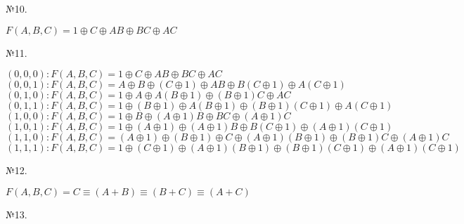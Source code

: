 \documentclass[a4paper,10pt]{report} %
\begin{document}
\newpage
\begin{center}
№10.
\end{center}
\begin{flushleft}
$ F(A,B,C)  = 1 \oplus C \oplus AB \oplus BC \oplus AC$ 
\end{flushleft}
\bigskip
\begin{center}
№11.
\end{center}
$ (0,0,0): F(A,B,C) = 1 \oplus C \oplus AB \oplus BC \oplus AC $  \\
$ (0,0,1): F(A,B,C) = A \oplus B \oplus (C\oplus 1) \oplus AB \oplus B(C\oplus 1) \oplus A(C\oplus 1) $ \\
$ (0,1,0): F(A,B,C) = 1 \oplus A \oplus A(B \oplus 1) \oplus (B \oplus 1)C \oplus AC $ \\
$ (0,1,1): F(A,B,C) = 1 \oplus (B \oplus 1) \oplus A(B \oplus 1) \oplus (B \oplus 1)(C\oplus 1) \oplus A(C\oplus 1) $ \\
$ (1,0,0): F(A,B,C) = 1 \oplus B \oplus (A \oplus 1)B \oplus BC \oplus (A \oplus 1)C $ \\
$ (1,0,1): F(A,B,C) = 1 \oplus (A \oplus 1) \oplus (A \oplus 1)B \oplus B(C\oplus 1) \oplus (A \oplus 1)(C\oplus 1)  $ \\
$ (1,1,0): F(A,B,C) = (A \oplus 1) \oplus (B \oplus 1) \oplus C \oplus (A \oplus 1)(B \oplus 1) \oplus (B \oplus 1)C \oplus (A \oplus 1)C $\\
$ (1,1,1): F(A,B,C) = 1 \oplus (C\oplus 1) \oplus (A \oplus 1)(B \oplus 1) \oplus (B \oplus 1)(C\oplus 1) \oplus (A \oplus 1)(C\oplus 1) $ \\
\begin{center} 
№12.  
\end{center} 
\begin{flushleft}
$ F(A,B,C) = C \equiv (A + B) \equiv (B + C) \equiv (A + C) $ \\
\end{flushleft}
\begin{center} 
№13.  
\end{center} 
\end{document}
